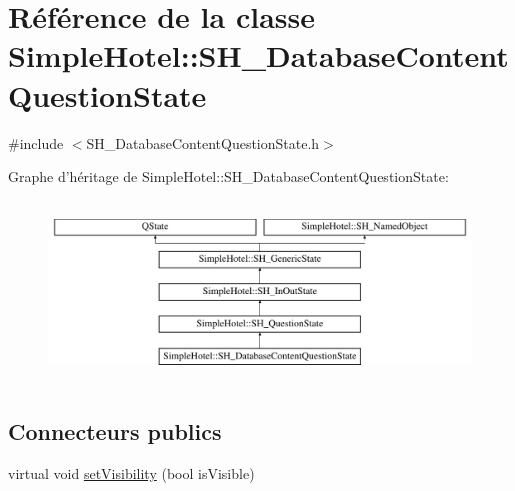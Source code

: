 \hypertarget{classSimpleHotel_1_1SH__DatabaseContentQuestionState}{\section{Référence de la classe Simple\-Hotel\-:\-:S\-H\-\_\-\-Database\-Content\-Question\-State}
\label{classSimpleHotel_1_1SH__DatabaseContentQuestionState}
}


{\ttfamily \#include $<$S\-H\-\_\-\-Database\-Content\-Question\-State.\-h$>$}

Graphe d'héritage de Simple\-Hotel\-:\-:S\-H\-\_\-\-Database\-Content\-Question\-State\-:\begin{figure}[H]
\begin{center}
\leavevmode
\includegraphics[height=4.827586cm]{classSimpleHotel_1_1SH__DatabaseContentQuestionState}
\end{center}
\end{figure}
\subsection*{Connecteurs publics}
\begin{DoxyCompactItemize}
\item 
virtual void \hyperlink{classSimpleHotel_1_1SH__InOutState_a2da1edbe247e9b2661c81c9dc2c7ef8d}{set\-Visibility} (bool is\-Visible)
\end{DoxyCompactItemize}
